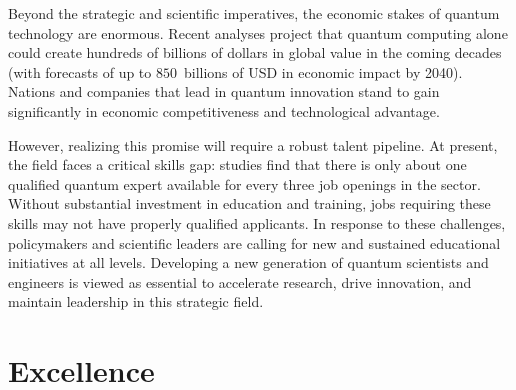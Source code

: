\documentclass{scrreprt}
\begin{document}
Beyond the strategic and scientific imperatives, the economic stakes
of quantum technology are enormous. Recent analyses project that
quantum computing alone could create hundreds of billions of dollars
in global value in the coming decades (with forecasts of up to
$850$~billions of USD in economic impact by 2040). Nations and companies that
lead in quantum innovation stand to gain significantly in economic
competitiveness and technological advantage.

However, realizing this promise will require a robust talent
pipeline. At present, the field faces a critical skills gap: studies
find that there is only about one qualified quantum expert available
for every three job openings in the sector. Without substantial
investment in education and training, jobs requiring these skills may not have properly qualified applicants. In response to these challenges, policymakers
and scientific leaders are calling for new and sustained educational
initiatives at all levels. Developing a new generation of quantum
scientists and engineers is viewed as essential to accelerate
research, drive innovation, and maintain leadership in this strategic
field.



\section{Excellence}

\begin{comment}
{\em Provide an expanded project description. Specify and describe the individual deliverables in the researcher school (activities, coordination activities, cooperation) in accordance with the requirements set out in the call. Please describe:
-	the expected scope, including the expected number of associated PhD candidates when the school is in full operation, as well as the assignment of supervisors and other scientific personnel;
-	the researcher school's scientific content in a broad sense, and objectives and delimitations, including the balance between measures to enhance scientific quality and relevance. The school’s activities should mainly be new initiatives or the continuation of existing initiatives. It must be clearly stated what is new;
-	national and (if relevant) international research groups and other partners that will form part of the network. Their contributions must be specified;
-	how the researcher school will quality assure activities and how the results will be documented.
Explain how the researcher school is linked to or will support the
doctoral degree programme at the collaborating institutions
scientifically, strategically and in terms of its benefit to
society. It is also important to clarify how the initiative is
innovative and will lead to added value beyond the activities that are
already in place or are currently being carried out.}
\end{comment}
\end{document}
